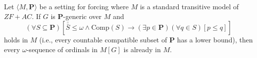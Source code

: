 Let $\langle M, \mathbf{P} \rangle$ be a setting for forcing where $M$ is a standard transitive model of $ZF + AC$. If $G$ is $\mathbf{P}$-generic over $M$ and
$$(\forall S \subseteq \mathbf{P})[\bar{\bar{S}} \leq \omega \land \text{Comp}(S) \rightarrow (\exists p \in \mathbf{P})(\forall q \in S)[p \leq q]]$$
holds in $M$ (i.e., every countable compatible subset of $\mathbf{P}$ has a lower bound), then every $\omega$-sequence of ordinals in $M[G]$ is already in $M$.
